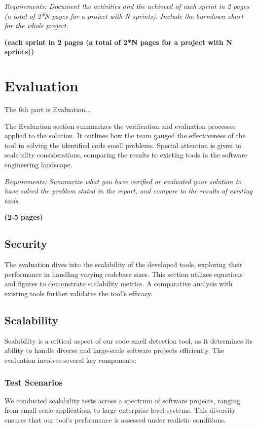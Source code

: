\documentclass[journal]{IEEEtran}
\begin{document}
\textit{Requirements: Document the activities and the achieved of each sprint in 2 pages (a total of 2*N pages for a project with N sprints). Include the burndown chart for the whole project.}



\textbf{(each sprint in 2 pages (a total of 2*N pages for a project with N sprints))}

\section{Evaluation}
\noindent The 6th part is Evaluation...


The Evaluation section summarizes the verification and evaluation processes applied to the solution. It outlines how the team gauged the effectiveness of the tool in solving the identified code smell problems. Special attention is given to scalability considerations, comparing the results to existing tools in the software engineering landscape.


\textit{Requirements: Summarize what you have verified or evaluated your solution to have solved the problem stated in the report, and compare to the results of existing tools}

\textbf{(2-5 pages)}


\subsection{Security}
The evaluation dives into the scalability of the developed tools, exploring their performance in handling varying codebase sizes. This section utilizes equations and figures to demonstrate scalability metrics. A comparative analysis with existing tools further validates the tool's efficacy.


\subsection{Scalability}

Scalability is a critical aspect of our code smell detection tool, as it determines its ability to handle diverse and large-scale software projects efficiently. The evaluation involves several key components:

\subsubsection{Test Scenarios}

We conducted scalability tests across a spectrum of software projects, ranging from small-scale applications to large enterprise-level systems. This diversity ensures that our tool's performance is assessed under realistic conditions.
\end{document}

